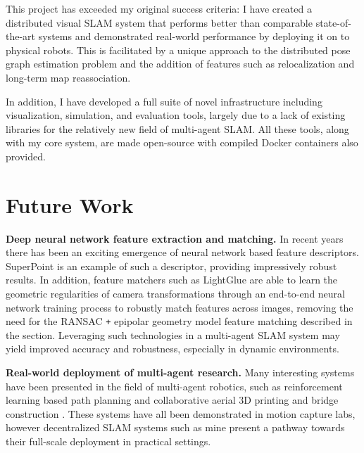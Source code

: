 

\label{sec:5}
This project has exceeded my original success criteria: I have created a distributed visual SLAM system that performs better than comparable state-of-the-art systems and demonstrated real-world performance by deploying it on to physical robots. This is facilitated by a unique approach to the distributed pose graph estimation problem and the addition of features such as relocalization and long-term map reassociation.

In addition, I have developed a full suite of novel infrastructure including visualization, simulation, and evaluation tools, largely due to a lack of existing libraries for the relatively new field of multi-agent SLAM. All these tools, along with my core system, are made open-source with compiled Docker containers also provided.

\section{Future Work}
\label{sec:future-work}
\textbf{Deep neural network feature extraction and matching.} In recent years there has been an exciting emergence of neural network based feature descriptors. SuperPoint \autocite{detone18superpoint} is an example of such a descriptor, providing impressively robust results. In addition, feature matchers such as LightGlue \autocite{lindenberger2023lightglue} are able to learn the geometric regularities of camera transformations through an end-to-end neural network training process to robustly match features across images, removing the need for the RANSAC \texttt{+} epipolar geometry model feature matching described in the  section. Leveraging such technologies in a multi-agent SLAM system may yield improved accuracy and robustness, especially in dynamic environments.

\textbf{Real-world deployment of multi-agent research.} Many interesting systems have been presented in the field of multi-agent robotics, such as reinforcement learning based path planning \autocite{bettini2022vmas} and collaborative aerial 3D printing \autocite{zhang2022aerial} and bridge construction \autocite{1d3d53ca-43c1-3e44-8ce1-3b0c374a8f1e}. These systems have all been demonstrated in motion capture labs, however decentralized SLAM systems such as mine present a pathway towards their full-scale deployment in practical settings.

